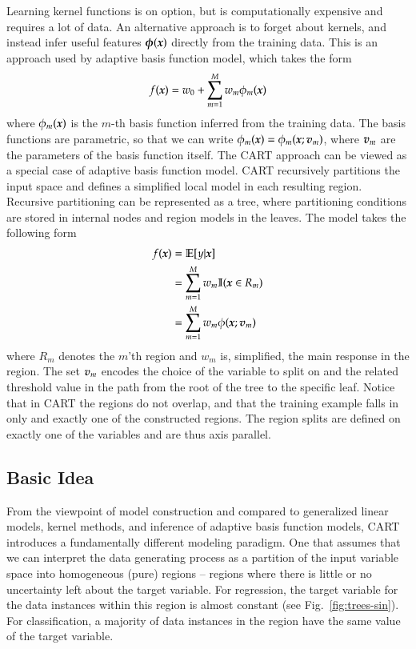 \begin{refsection}
Learning kernel functions is on option, but is computationally expensive and requires a lot of data. An alternative approach is to forget about kernels, and instead infer useful features $\boldsymbol{\phi}(\boldsymbol{x})$ directly from the training data. This is an approach used by adaptive basis function model, which takes the form
$$ f(\boldsymbol{x})=w_0+\sum_{m=1}^{M} w_m\phi_m(\boldsymbol{x}) $$
where $\phi_m(\boldsymbol{x})$ is the $m$-th basis function inferred from the training data. The basis functions are parametric, so that we can write $\phi_m(\boldsymbol{x})=\phi_m(\boldsymbol{x};\boldsymbol{v}_m)$, where $\boldsymbol{v}_m$ are the parameters of the basis function itself. The CART approach can be viewed as a special case of adaptive basis function model. CART recursively partitions the input space and defines a simplified local model in each resulting region. Recursive partitioning can be represented as a tree, where partitioning conditions are stored in internal nodes and region models in the leaves. The model takes the following form
\begin{align}
f(\boldsymbol{x}) & = \mathbb{E}[y|\boldsymbol{x}] \\
 & = \sum_{m=1}^M w_m \mathbb{I}(\boldsymbol{x}\in R_m) \\
 & = \sum_{m=1}^M w_m\phi(\boldsymbol{x};\boldsymbol{v}_m)
\end{align}
where $R_m$ denotes the $m$'th region and $w_m$ is, simplified, the main response in the region. The set $\boldsymbol{v}_m$ encodes the choice of the variable to split on and the related threshold value in the path from the root of the tree to the specific leaf. Notice that in CART the regions do not overlap, and that the training example falls in only and exactly one of the constructed regions. The region splits are defined on exactly one of the variables and are thus axis parallel.

\subsection*{Basic Idea}

From the viewpoint of model construction and compared to generalized linear models, kernel methods, and inference of adaptive basis function models, CART introduces a fundamentally different modeling paradigm. One that assumes that we can interpret the data generating process as a partition of the input variable space into homogeneous (pure) regions -- regions where there is little or no uncertainty left about the target variable. For regression, the target variable for the data instances within this region is almost constant (see Fig.~\ref{fig:trees-sin}). For classification, a majority of data instances in the region have the same value of the target variable.


\end{refsection}
